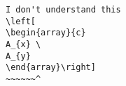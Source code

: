 \begin{verbatim}
I don't understand this
\left[
\begin{array}{c}
A_{x} \ 
A_{y}
\end{array}\right]
~~~~~~^
\end{verbatim}
